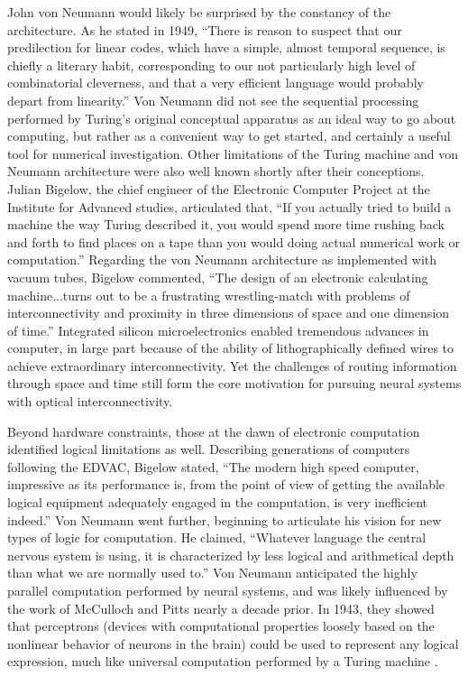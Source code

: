 \documentclass[twocolumn]{article}
\begin{document}
John von Neumann would likely be surprised by the constancy of the architecture. As he stated in 1949, ``There is reason to suspect that our predilection for linear codes, which have a simple, almost temporal sequence, is chiefly a literary habit, corresponding to our not particularly high level of combinatorial cleverness, and that a very efficient language would probably depart from linearity.'' \cite{ne1949} Von Neumann did not see the sequential processing performed by Turing's original conceptual apparatus as an ideal way to go about computing, but rather as a convenient way to get started, and certainly a useful tool for numerical investigation. Other limitations of the Turing machine and von Neumann architecture were also well known shortly after their conceptions. Julian Bigelow, the chief engineer of the Electronic Computer Project at the Institute for Advanced studies, articulated that, ``If you actually tried to build a machine the way Turing described it, you would spend more time rushing back and forth to find places on a tape than you would doing actual numerical work or computation.'' Regarding the von Neumann architecture as implemented with vacuum tubes, Bigelow commented, ``The design of an electronic calculating machine...turns out to be a frustrating wrestling-match with problems of interconnectivity and proximity in three dimensions of space and one dimension of time.'' Integrated silicon microelectronics enabled tremendous advances in computer, in large part because of the ability of lithographically defined wires to achieve extraordinary interconnectivity. Yet the challenges of routing information through space and time still form the core motivation for pursuing neural systems with optical interconnectivity.

Beyond hardware constraints, those at the dawn of electronic computation identified logical limitations as well. Describing generations of computers following the EDVAC, Bigelow stated, ``The modern high speed computer, impressive as its performance is, from the point of view of getting the available logical equipment adequately engaged in the computation, is very inefficient indeed.'' Von Neumann went further, beginning to articulate his vision for new types of logic for computation. He claimed, ``Whatever language the central nervous system is using, it is characterized by less logical and arithmetical depth than what we are normally used to.'' \cite{ne1958} Von Neumann anticipated the highly parallel computation performed by neural systems, and was likely influenced by the work of McCulloch and Pitts nearly a decade prior. In 1943, they showed that perceptrons (devices with computational properties loosely based on the nonlinear behavior of neurons in the brain) could be used to represent any logical expression, much like universal computation performed by a Turing machine \cite{mcpi1943}. 
\end{document}
